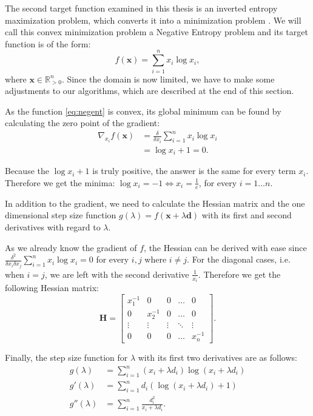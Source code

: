 \documentclass[a4paper,english,titlepage,12pt]{article}
\newcommand{\vect}[1]{\ensuremath{\mathbf{#1}}}
\begin{document}
The second target function examined in this thesis is an inverted entropy maximization problem, which converts it into a minimization problem \cite{book:convex_optimization}. We will call this convex minimization problem a Negative Entropy problem and its target function is of the form:
\begin{equation}\label{eq:negent}
	f(\vect{x}) = \sum_{i=1}^{n} x_i \log x_i,
\end{equation}
where $\vect{x} \in \mathbb{R}_{> 0}^n$. Since the domain is now limited, we have to make some adjustments to our algorithms, which are described at the end of this section.

As the function \eqref{eq:negent} is convex, its global minimum can be found by calculating the zero point of the gradient:
\begin{align}
    \nabla_{x_i} f(\vect{x}) &= \frac{\delta}{\delta x_i} \sum_{i=1}^{n} x_i \log x_i \\
                      &= \log x_i + 1 = 0.
\end{align}

Because the $\log x_i + 1$ is truly positive, the answer is the same for every term $x_i$. Therefore we get the minima: $\log x_i = -1 \Leftrightarrow x_i = \frac{1}{e}$, for every $i = 1 \dots n$.

In addition to the gradient, we need to calculate the Hessian matrix and the one dimensional step size function $g(\lambda) = f(\vect{x} + \lambda \vect{d})$ with its first and second derivatives with regard to $\lambda$.

As we already know the gradient of $f$, the Hessian can be derived with ease since $\frac{\delta^2}{\delta x_i \delta x_j} \sum_{i=1}^{n} x_i \log x_i = 0$ for every $i, j$ where $i \neq j$. For the diagonal cases, i.e. when $i = j$, we are left with the second derivative $\frac{1}{x_i}$. Therefore we get the following Hessian matrix:
\begin{equation}
    \textbf{H} =
    \begin{bmatrix}
    x_1^{-1} & 0        & 0      & \dots  & 0      \\
    0        & x_2^{-1} & 0      & \dots  & 0      \\
    \vdots   & \vdots   & \vdots & \ddots & \vdots \\
    0        & 0        & 0      & \dots  & x_n^{-1}
\end{bmatrix}.
\end{equation}

Finally, the step size function for $\lambda$ with its first two derivatives are as follows:
\begin{align}
    g(\lambda) &= \sum_{i=1}^{n} (x_i + \lambda d_i) \log (x_i + \lambda d_i) \\
    g'(\lambda) &= \sum_{i=1}^{n} d_i (\log(x_i + \lambda d_i) + 1) \\
    g''(\lambda) &= \sum_{i=1}^{n} \frac{d_i^2}{x_i + \lambda d_i}.
\end{align}
\end{document}

